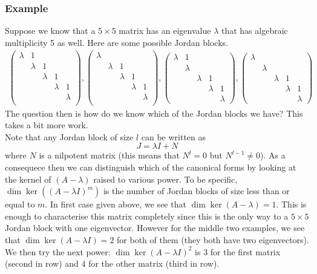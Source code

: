 \subsubsection{Example}
Suppose we know that a $5 \times 5$ matrix has an eigenvalue $\lambda$ that has algebraic multiplicity 5 as well. Here are some possible Jordan blocks.
\begin{align*}
    \begin{pmatrix}
    \lambda & 1 & & & \\
    & \lambda & 1 \\
    & & \lambda & 1 \\
    & & & \lambda & 1 \\
    & & & & \lambda\\
    \end{pmatrix}, 
    \begin{pmatrix}
    \lambda & & & & \\
    & \lambda & 1 \\
    & & \lambda & 1 \\
    & & & \lambda & 1 \\
    & & & & \lambda\\
    \end{pmatrix}, 
    \begin{pmatrix}
    \lambda & 1 & & &\\
    & \lambda \\
    & & \lambda & 1 \\
    & & & \lambda & 1\\
    & & & & \lambda
    \end{pmatrix},
    \begin{pmatrix}
    \lambda & & & &\\
    & \lambda \\
    & & \lambda & 1 \\
    & & & \lambda & 1\\
    & & & & \lambda
    \end{pmatrix}
\end{align*}
The question then is how do we know which of the Jordan blocks we have? This takes a bit more work.\\

Note that any Jordan block of size $l$ can be written as
$$ J = \lambda I + N $$
where $N$ is a nilpotent matrix (this means that $N^l = 0$ but $N^{l - 1} \neq 0$). As a consequece then we can distinguish which of the canonical forms by looking at the kernel of $(A - \lambda)$ raised to various power. To be specific, $\dim \ker((A - \lambda I)^{m})$ is the number of Jordan blocks of size less than or equal to $m$. In first case given above, we see that $\dim \ker(A - \lambda) = 1$. This is enough to characterise this matrix completely since this is the only way to a $5 \times 5$ Jordan block with one eigenvector. However for the middle two examples, we see that $\dim \ker (A - \lambda I) = 2$ for both of them (they both have two eigenvectors). We then try the next power: $\dim \ker(A - \lambda I)^2$ is 3 for the first matrix (second in row) and 4 for the other matrix (third in row).

